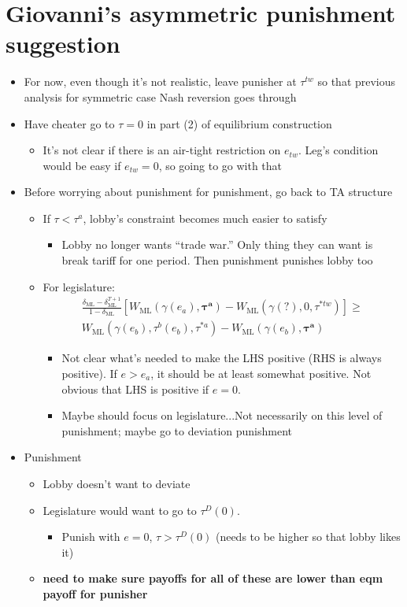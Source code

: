 \documentclass[12pt]{article}
\newcommand{\bta}{\bm{\tau^a}}
\newcommand{\ga}{\gamma}
\newcommand{\de}{\delta}
\begin{document}
\newpage
\section{Giovanni's asymmetric punishment suggestion}
\begin{itemize}
	\item For now, even though it's not realistic, leave punisher at $\tau^{tw}$ so that previous analysis for symmetric case Nash reversion goes through
	\item Have cheater go to $\tau = 0$ in part (2) of equilibrium construction
		\begin{itemize}
			\item It's not clear if there is an air-tight restriction on $e_{tw}$. Leg's condition would be easy if $e_{tw} = 0$, so going to go with that
		\end{itemize}
	\item Before worrying about punishment for punishment, go back to TA structure
		\begin{itemize}
			\item If $\tau < \tau^a$, lobby's constraint becomes much easier to satisfy
				\begin{itemize}
					\item Lobby no longer wants ``trade war.'' Only thing they can want is break tariff for one period. Then punishment punishes lobby too
				\end{itemize}
			\item For legislature:
				\begin{multline}
  \frac{\de_\text{ML} - \de_\text{ML}^{T+1}}{1-\de_\text{ML}} \left[W_\text{ML}(\ga(e_a),\bta) - W_{\text{ML}}(\ga(?),0,\tau^{*tw}) \right] \geq \\
	W_{\text{ML}}(\ga(e_b),\tau^b(e_b),\tau^{*a}) - W_{\text{ML}}(\ga(e_b),\bta)
				\end{multline}
				\begin{itemize}
					\item Not clear what's needed to make the LHS positive (RHS is always positive). If $e > e_a$, it should be at least somewhat positive. Not obvious that LHS is positive if $e=0$.
					\item Maybe should focus on legislature...Not necessarily on this level of punishment; maybe go to deviation punishment
				\end{itemize}

		\end{itemize}
	\item Punishment
		\begin{itemize}
			\item Lobby doesn't want to deviate
			\item Legislature would want to go to $\tau^D(0)$.
				\begin{itemize}
					\item Punish with $e=0$, $\tau > \tau^D(0)$ (needs to be higher so that lobby likes it)
				\end{itemize}
			\item \textbf{need to make sure payoffs for all of these are lower than eqm payoff for punisher}
		\end{itemize}
\end{itemize}

	
\end{document}
